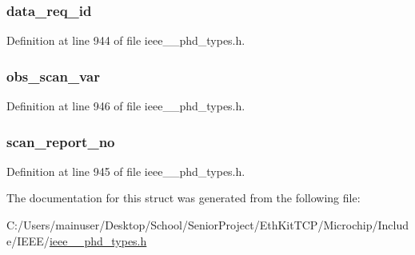 \subsubsection[{data\+\_\+req\+\_\+id}]{ data\+\_\+req\+\_\+id}\label{struct___scan_report_info_var_a1c786af4096ed61c5f6cfdf27f317b70}


Definition at line 944 of file ieee\+\_\+\_\+phd\+\_\+types.\+h.

\hypertarget{struct___scan_report_info_var_a6d5c6c418b113f9a497af2f629f77440}{}
\subsubsection[{obs\+\_\+scan\+\_\+var}]{ obs\+\_\+scan\+\_\+var}\label{struct___scan_report_info_var_a6d5c6c418b113f9a497af2f629f77440}


Definition at line 946 of file ieee\+\_\+\_\+phd\+\_\+types.\+h.

\hypertarget{struct___scan_report_info_var_a21f75132869d4d200ffe01d91b4736d8}{}
\subsubsection[{scan\+\_\+report\+\_\+no}]{ scan\+\_\+report\+\_\+no}\label{struct___scan_report_info_var_a21f75132869d4d200ffe01d91b4736d8}


Definition at line 945 of file ieee\+\_\+\_\+phd\+\_\+types.\+h.



The documentation for this struct was generated from the following file\+:\begin{DoxyCompactItemize}
\item 
C\+:/\+Users/mainuser/\+Desktop/\+School/\+Senior\+Project/\+Eth\+Kit\+T\+C\+P/\+Microchip/\+Include/\+I\+E\+E\+E/\hyperlink{ieee__11073__phd__types_8h}{ieee\+\_\+\_\+phd\+\_\+types.\+h}\end{DoxyCompactItemize}
